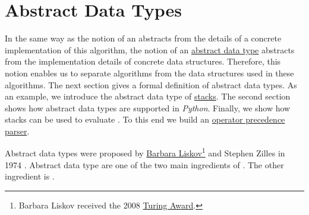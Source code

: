 \chapter{Abstract Data Types}
In the same way as the notion of an  abstracts from the details of a concrete
implementation of this algorithm, the notion of an \href{https://en.wikipedia.org/wiki/Abstract_data_type}{abstract data type} abstracts from the implementation
details of concrete data structures.  Therefore, this notion enables us to separate algorithms from the data
structures used in these algorithms.  The next section gives a formal definition of
abstract data types.  As an example, we introduce the abstract data type of
\href{https://en.wikipedia.org/wiki/Stack_(abstract_data_type)}{stacks}.
The second section shows how abstract data types are supported in \textsl{Python}.  Finally, we show how stacks can be used
to evaluate .  To this end we build an
\href{https://en.wikipedia.org/wiki/Operator-precedence_parser}{operator precedence parser}. 

Abstract data types were proposed by 
\href{https://en.wikipedia.org/wiki/Barbara_Liskov}{Barbara Liskov}\footnote{
  Barbara Liskov received the 2008 \href{https://en.wikipedia.org/wiki/Turing_Award}{Turing Award}.}
and Stephen Zilles in 1974 \cite{liskov:1974}.  Abstract data type are one of the two main ingredients of
.  The other ingredient is .

